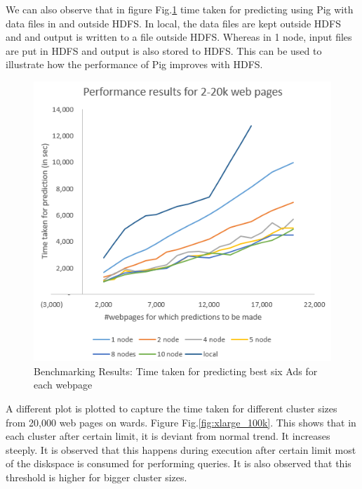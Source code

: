 \documentclass[9pt,twocolumn,twoside]{../../styles/osajnl}
\begin{document}
We can also observe that in figure Fig.\ref{fig:xlarge_20k} time taken for predicting using Pig with data files in and outside HDFS. In local, the data files are kept outside HDFS and and output is written to a file outside HDFS. Whereas in 1 node, input files are put in HDFS and output is also stored to HDFS. This can be used to illustrate how the performance of Pig improves with HDFS.

\begin{figure}[hptb]
\centering
\includegraphics[width=\linewidth]{images/xlarge_20k.PNG}
\caption{ Benchmarking Results: Time taken for predicting best six Ads for each webpage}
\label{fig:xlarge_20k}
\end{figure}

A different plot is plotted to capture the time taken for different cluster sizes from 20,000 web pages on wards. Figure Fig.\ref{fig:xlarge_100k}. This shows that in each cluster after certain limit, it is deviant from normal trend. It increases steeply. It is observed that this happens during execution after certain limit most of the diskspace is consumed for performing queries. It is also observed that this threshold is higher for bigger cluster sizes.
\end{document}
